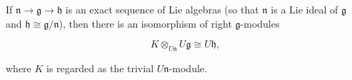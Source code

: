 If $\mathfrak{n} \to \mathfrak{g} \to \mathfrak{h}$ is an exact sequence of Lie algebras (so that $\mathfrak{n}$ is a Lie ideal of $\mathfrak{g}$ and $\mathfrak{h} \cong \mathfrak{g}/\mathfrak{n}$), then there is an isomorphism of right $\mathfrak{g}$-modules

$$K \otimes_{U\mathfrak{n}} U\mathfrak{g} \cong U\mathfrak{h},$$

where $K$ is regarded as the trivial $U\mathfrak{n}$-module.
